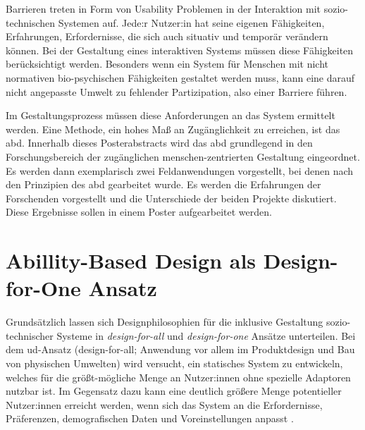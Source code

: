 \documentclass[sigchi-a,screen,nonacm,language=german]{acmart}
\theoremstyle{acmdefinition}
\begin{document}
Barrieren treten in Form von Usability Problemen in der Interaktion mit sozio-technischen Systemen auf.
Jede:r Nutzer:in hat seine eigenen Fähigkeiten, Erfahrungen, Erfordernisse, die sich auch situativ und temporär verändern können. %
Bei der Gestaltung eines interaktiven Systems müssen diese Fähigkeiten berücksichtigt werden. Besonders wenn ein System für Menschen mit nicht normativen bio-psychischen Fähigkeiten gestaltet werden muss, kann eine darauf nicht angepasste Umwelt zu fehlender Partizipation, also einer Barriere führen. %

Im Gestaltungsprozess müssen diese Anforderungen an das System ermittelt werden. Eine Methode, ein hohes Maß an Zugänglichkeit zu erreichen, ist das \ac{abd}. Innerhalb dieses Posterabstracts wird das \ac{abd} grundlegend in den Forschungsbereich der zugänglichen menschen-zentrierten Gestaltung eingeordnet. Es werden dann exemplarisch zwei Feldanwendungen %
vorgestellt, bei denen nach den Prinzipien des \ac{abd} gearbeitet wurde. Es werden die Erfahrungen der Forschenden vorgestellt und die Unterschiede der beiden Projekte diskutiert. Diese Ergebnisse sollen in einem Poster aufgearbeitet werden.



\section{Abillity-Based Design als Design-for-One Ansatz}
\label{sec:abd}





Grundsätzlich lassen sich Designphilosophien für die inklusive Gestaltung sozio-technischer Systeme in \emph{design-for-all} und \emph{design-for-one} Ansätze unterteilen. Bei dem \ac{ud}-Ansatz (design-for-all; Anwendung vor allem im Produktdesign und Bau von physischen Umwelten) wird versucht, ein statisches System zu entwickeln, welches für die größt-mögliche Menge an Nutzer:innen ohne spezielle Adaptoren nutzbar ist. Im Gegensatz dazu kann eine deutlich größere Menge potentieller Nutzer:innen erreicht werden, wenn sich das System an die Erfordernisse, Präferenzen, demografischen Daten und Voreinstellungen anpasst \citep{benyon-etal:inclusive-design:2001}.
\end{document}
